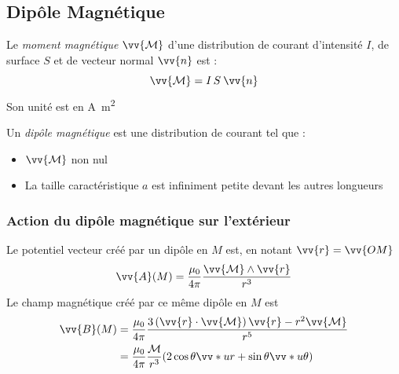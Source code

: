 \documentclass[11pt,a4paper,fleqn,pdftex]{report}
\begin{document}
\subsection{Dipôle Magnétique} %
\label{sec:dipole_magnetique}
  \begin{dfn}
     Le \emph{moment magnétique} $\vv{\mathcal{M}}$ d'une distribution de courant d'intensité $I$, de surface $S$ et de vecteur normal $\vv{n}$ est :
     \begin{equation}
     \vv{\mathcal{M}} = I\, S \: \vv{n}
     \end{equation}
     Son unité est en \si{\ampere\square\meter}
  \end{dfn}
\begin{dfn}
   Un \emph{dipôle magnétique} est une distribution de courant tel que : 
   \begin{itemize}[label=$-$, noitemsep, topsep=4pt,parsep=0pt,partopsep=0pt,leftmargin=\parindent,labelindent=\parindent]
  \item $\vv{\mathcal{M}}$ non nul
  \item La taille caractéristique $a$ est infiniment petite devant les autres longueurs
  \end{itemize}
\end{dfn}
\subsubsection{Action du dipôle magnétique sur l'extérieur}
\begin{theorem}
   Le potentiel vecteur créé par un dipôle en $M$ est, en notant $\vv{r} = \vv{OM}$ 
   \begin{equation}
   \vv{A}(M) = \dfrac{\mu_0}{4\pi} \dfrac{\vv{\mathcal{M}}\wedge \vv{r}}{r^3}
   \end{equation}
   Le champ magnétique créé par ce même dipôle en $M$ est 
\begin{align}
\vv{B}(M) &= \dfrac{\mu_0}{4\pi}\dfrac{3\left( \vv{r}\cdot \vv{\mathcal{M}}\right) \vv{r} - r^2\vv{\mathcal{M}}}{r^5}\\
&= \dfrac{\mu_0}{4\pi} \dfrac{\mathcal{M}}{r^3}(2\cos \theta \vv*{u}{r} + \sin \theta \vv*{u}{\theta})
\end{align}
\end{theorem}
\end{document}
